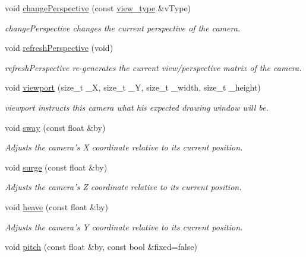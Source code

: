 \begin{DoxyCompactItemize}
void \hyperlink{class_camera_aaadaebb40dc7262abc3f4bc52bc5bfb3}{change\-Perspective} (const \hyperlink{class_camera_afdccec6d447490dcc80ab6b99f21d0e5}{view\-\_\-type} \&v\-Type)
\begin{DoxyCompactList}\small\item\em change\-Perspective changes the current perspective of the camera. \end{DoxyCompactList}\item 
void \hyperlink{class_camera_a24c5346fc0dfaa93257b6716fe0f2421}{refresh\-Perspective} (void)
\begin{DoxyCompactList}\small\item\em refresh\-Perspective re-\/generates the current view/perspective matrix of the camera. \end{DoxyCompactList}\item 
void \hyperlink{class_camera_adda458a9212825164b52019597f2e9c8}{viewport} (size\-\_\-t \-\_\-\-X, size\-\_\-t \-\_\-\-Y, size\-\_\-t \-\_\-width, size\-\_\-t \-\_\-height)
\begin{DoxyCompactList}\small\item\em viewport instructs this camera what his expected drawing window will be. \end{DoxyCompactList}\item 
void \hyperlink{class_camera_abbe6fe82ed05e64e35b0c4ed2001b34e}{sway} (const float \&by)
\begin{DoxyCompactList}\small\item\em Adjusts the camera's X coordinate relative to its current position. \end{DoxyCompactList}\item 
void \hyperlink{class_camera_abb2251df65445bf8efd3fe0074fb5033}{surge} (const float \&by)
\begin{DoxyCompactList}\small\item\em Adjusts the camera's Z coordinate relative to its current position. \end{DoxyCompactList}\item 
void \hyperlink{class_camera_a2148d751f104d8e39c9832e2372df2d9}{heave} (const float \&by)
\begin{DoxyCompactList}\small\item\em Adjusts the camera's Y coordinate relative to its current position. \end{DoxyCompactList}\item 
void \hyperlink{class_camera_aac7dbb6201be7f17e014fc6fdf915560}{pitch} (const float \&by, const bool \&fixed=false)

\end{DoxyCompactItemize}
